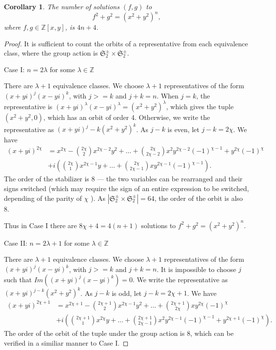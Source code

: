 \documentclass[12pt]{article}
\newtheorem{corollary}[theorem]{Corollary}
\theoremstyle{definition}
\theoremstyle{remark}
\newcommand{\Zzz}{\mathbb Z}
\numberwithin{equation}{section}
\begin{document}
\begin{corollary}

The number of solutions \( (f, g) \) to
\[
f^2 + g^2 = (x^2 + y^2)^n,
\]
where \( f, g \in \Zzz[x,y] \), is \(4n + 4\).

\end{corollary}
\begin{proof}
It is sufficient to count the orbits of a representative from each
equivalence class, where the group action is
\( \mathfrak{S}_2^\pm \times \mathfrak{S}_2^\pm \).

\noindent
Case I: \( n = 2\lambda \) for some \( \lambda \in \Zzz \)

There are \( \lambda + 1 \) equivalence classes. We choose \( \lambda + 1 \)
representatives of the form \( (x + yi)^j (x - yi)^k \), with
\( j >= k \) and \( j + k = n \). When \( j = k \), the representative
is \( (x + yi)^\lambda (x - yi)^\lambda = ( x^2 + y^2 ) ^ \lambda \), which
gives the tuple \( ( x^2 + y^2, 0 ) \), which has an orbit of order 4.
Otherwise, we write the representative as \( (x + yi)^j-k (x^2 + y^2)^k \).
As \( j - k \) is even, let \( j - k = 2\chi \). We have
\begin{align*}
(x + yi) ^ {2\chi} &= x ^ {2\chi} - \binom{2\chi}{2}  x^{2\chi - 2 } y^2
+ \ldots + \binom{2\chi}{2\chi-2} x^2 y^{2\chi - 2} (-1) ^ {\chi - 1}
+  y^{2\chi} (-1) ^ {\chi}
\\
&+ i \left( \binom{2\chi}{1} x ^ {2\chi - 1} y + \ldots +
\binom{2\chi}{2\chi-1}  x y ^ {2\chi -1} (-1)^{\chi-1} \right).
\end{align*}
The order of the stabilizer is 8 --- the two variables can be rearranged and their
signs switched (which may require the sign of an entire expression to be switched,
depending of the parity of \( \chi \) ).
As \( | \mathfrak{S}_2^\pm \times \mathfrak{S}_2^\pm | = 64\), the order of the orbit
is also 8. 

Thus in Case I there are \( 8\chi + 4 = 4 (n + 1 ) \) solutions
to \( f^2 + g^2 = (x^2 + y^2)^n \).

\noindent
Case II: \( n = 2\lambda + 1\) for some \( \lambda \in \Zzz \)

There are \( \lambda + 1 \) equivalence classes. We choose \( \lambda + 1 \)
representatives of the form \( (x + yi)^j (x - yi)^k \), with
\( j >= k \) and \( j + k = n \).
It is impossible to
choose \( j \) such that \( Im\left( (x + yi)^j (x - yi)^k \right) = 0\).
We write the representative as \( (x + yi)^{j-k} (x^2 + y^2)^k \).
As \( j - k \) is odd, let \( j - k = 2\chi + 1 \). We have
\begin{align*}
(x + yi) ^ {2\chi + 1} &= x ^ {2\chi + 1} - \binom{2\chi+1}{2}  x^{2\chi - 1 } y^2
+ \ldots + \binom{2\chi+1}{2\chi} x y^{2\chi} (-1) ^ {\chi}
\\
&+ i \left( \binom{2\chi+1}{1} x ^ {2\chi} y + \ldots +
\binom{2\chi+1}{2\chi-1}  x^2 y ^ {2\chi -1} (-1)^{\chi-1}
+  y^{2\chi+1} (-1) ^ {\chi}
\right).
\end{align*}
The order of the orbit of the tuple under the group action is 8, which can be
verified in a similiar manner to Case I.


\end{proof}
\end{document}
